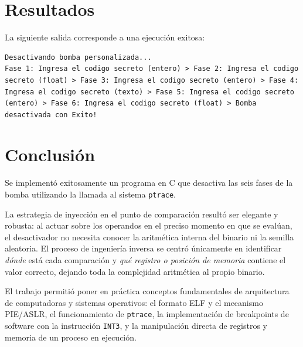 \documentclass[10pt,a4paper]{article}
\begin{document}
\section{Resultados}

La siguiente salida corresponde a una ejecución exitosa:

\begin{lstlisting}[style=termstyle]
Desactivando bomba personalizada...
Fase 1: Ingresa el codigo secreto (entero) > Fase 2: Ingresa el codigo secreto (float) > Fase 3: Ingresa el codigo secreto (entero) > Fase 4: Ingresa el codigo secreto (texto) > Fase 5: Ingresa el codigo secreto (entero) > Fase 6: Ingresa el codigo secreto (float) > Bomba desactivada con Exito!
\end{lstlisting}
\section{Conclusión}

Se implementó exitosamente un programa en C que desactiva las seis fases de la bomba utilizando la llamada al sistema \texttt{ptrace}.

La estrategia de inyección en el punto de comparación resultó ser elegante y robusta: al actuar sobre los operandos en el preciso momento en que se evalúan, el desactivador no necesita conocer la aritmética interna del binario ni la semilla aleatoria. El proceso de ingeniería inversa se centró únicamente en identificar \textit{dónde} está cada comparación y \textit{qué registro o posición de memoria} contiene el valor correcto, dejando toda la complejidad aritmética al propio binario.

El trabajo permitió poner en práctica conceptos fundamentales de arquitectura de computadoras y sistemas operativos: el formato ELF y el mecanismo PIE/ASLR, el funcionamiento de \texttt{ptrace}, la implementación de breakpoints de software con la instrucción \texttt{INT3}, y la manipulación directa de registros y memoria de un proceso en ejecución.
\end{document}
